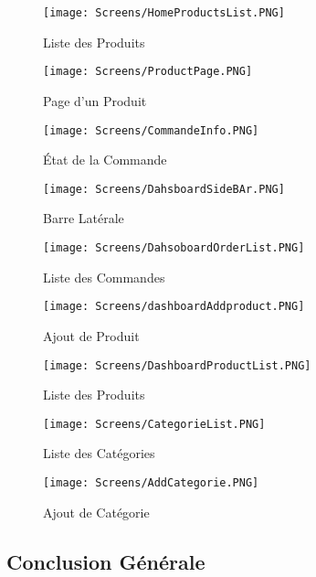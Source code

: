 \begin{figure}[H]
    \centering
    \texttt{[image: Screens/HomeProductsList.PNG]}
    \caption{Liste des Produits}
\end{figure}

\begin{figure}[H]
    \centering
    \texttt{[image: Screens/ProductPage.PNG]}
    \caption{Page d'un Produit}
\end{figure}

\begin{figure}[H]
    \centering
    \texttt{[image: Screens/CommandeInfo.PNG]}
    \caption{État de la Commande}
\end{figure}

\begin{figure}[H]
    \centering
    \texttt{[image: Screens/DahsboardSideBAr.PNG]}
    \caption{Barre Latérale}
\end{figure}

\begin{figure}[H]
    \centering
    \texttt{[image: Screens/DahsoboardOrderList.PNG]}
    \caption{Liste des Commandes}
\end{figure}

\begin{figure}[H]
    \centering
    \texttt{[image: Screens/dashboardAddproduct.PNG]}
    \caption{Ajout de Produit}
\end{figure}

\begin{figure}[H]
    \centering
    \texttt{[image: Screens/DashboardProductList.PNG]}
    \caption{Liste des Produits}
\end{figure}

\begin{figure}[H]
    \centering
    \texttt{[image: Screens/CategorieList.PNG]}
    \caption{Liste des Catégories}
\end{figure}

\begin{figure}[H]
    \centering
    \texttt{[image: Screens/AddCategorie.PNG]}
    \caption{Ajout de Catégorie}
\end{figure}








\begin{center}
\chapter*{Conclusion Générale}
\end{center}


